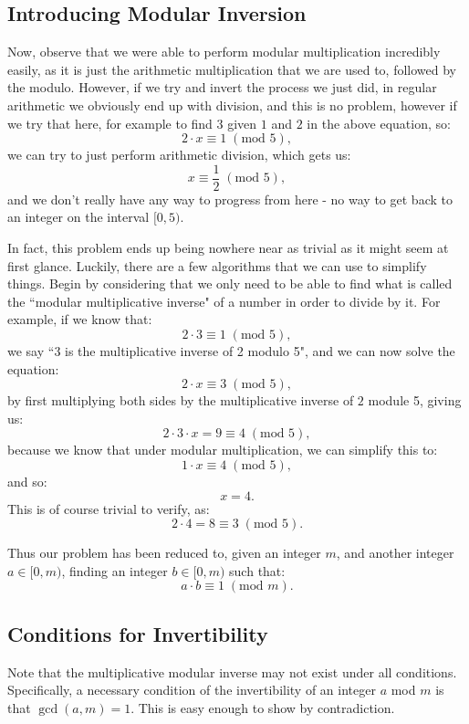 \documentclass{article}
\begin{document}
\subsection{Introducing Modular Inversion}
Now, observe that we were able to perform modular multiplication incredibly easily, as it is just the arithmetic multiplication that we are used to, followed by the modulo. However, if we try and invert the process we just did, in regular arithmetic we obviously end up with division, and this is no problem, however if we try that here, for example to find $3$ given $1$ and $2$ in the above equation, so:
\[
    2 \cdot x \equiv 1 \; (\text{mod } 5),
\]
we can try to just perform arithmetic division, which gets us:
\[
    x \equiv \frac{1}{2} \; (\text{mod } 5),
\]
and we don't really have any way to progress from here - no way to get back to an integer on the interval $[0, 5)$. \medskip

\noindent In fact, this problem ends up being nowhere near as trivial as it might seem at first glance. Luckily, there are a few algorithms that we can use to simplify things. Begin by considering that we only need to be able to find what is called the ``modular multiplicative inverse" of a number in order to divide by it. For example, if we know that:
\[
    2 \cdot 3 \equiv 1 \; (\text{mod } 5),
\]
we say ``3 is the multiplicative inverse of 2 modulo 5", and we can now solve the equation:
\[
    2 \cdot x \equiv 3 \; (\text{mod } 5),
\]
by first multiplying both sides by the multiplicative inverse of $2$ module 5, giving us:
\[
    2 \cdot 3 \cdot x = 9 \equiv 4 \; (\text{mod } 5),
\]
because we know that under modular multiplication, we can simplify this to:
\[
    1 \cdot x \equiv 4 \; (\text{mod } 5),
\]
and so:
\[
    x = 4.
\]
This is of course trivial to verify, as:
\[
    2 \cdot 4 = 8 \equiv 3 \; (\text{mod } 5).
\]

Thus our problem has been reduced to, given an integer $m$, and another integer $a \in [0, m)$, finding an integer $b \in [0, m)$ such that:
\[
    a \cdot b \equiv 1 \; (\text{mod } m).
\]

\subsection{Conditions for Invertibility}
Note that the multiplicative modular inverse may not exist under all conditions. Specifically, a necessary condition of the invertibility of an integer $a$ mod $m$ is that $\gcd(a, m) = 1$. This is easy enough to show by contradiction. \medskip
\end{document}
